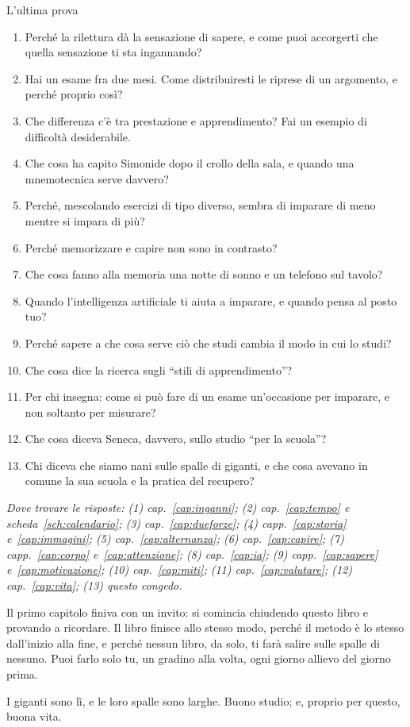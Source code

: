 \begin{riquadro}{L'ultima prova}
\begin{enumerate}
  \item Perché la rilettura dà la sensazione di sapere, e come puoi
        accorgerti che quella sensazione ti sta ingannando?
  \item Hai un esame fra due mesi. Come distribuiresti le riprese di
        un argomento, e perché proprio così?
  \item Che differenza c'è tra prestazione e apprendimento? Fai un
        esempio di difficoltà desiderabile.
  \item Che cosa ha capito Simonide dopo il crollo della sala, e quando
        una mnemotecnica serve davvero?
  \item Perché, mescolando esercizi di tipo diverso, sembra di imparare
        di meno mentre si impara di più?
  \item Perché memorizzare e capire non sono in contrasto?
  \item Che cosa fanno alla memoria una notte di sonno e un telefono
        sul tavolo?
  \item Quando l'intelligenza artificiale ti aiuta a imparare, e quando
        pensa al posto tuo?
  \item Perché sapere a che cosa serve ciò che studi cambia il modo in
        cui lo studi?
  \item Che cosa dice la ricerca sugli \enquote{stili di
        apprendimento}?
  \item Per chi insegna: come si può fare di un esame un'occasione per
        imparare, e non soltanto per misurare?
  \item Che cosa diceva Seneca, davvero, sullo studio \enquote{per la
        scuola}?
  \item Chi diceva che siamo nani sulle spalle di giganti, e che cosa
        avevano in comune la sua scuola e la pratica del recupero?
\end{enumerate}

\smallskip
{\footnotesize\itshape Dove trovare le risposte: (1)
cap.~\ref{cap:inganni}; (2) cap.~\ref{cap:tempo} e
scheda~\ref{sch:calendario}; (3) cap.~\ref{cap:dueforze}; (4)
capp.~\ref{cap:storia} e~\ref{cap:immagini}; (5)
cap.~\ref{cap:alternanza}; (6) cap.~\ref{cap:capire}; (7)
capp.~\ref{cap:corpo} e~\ref{cap:attenzione}; (8) cap.~\ref{cap:ia};
(9) capp.~\ref{cap:sapere} e~\ref{cap:motivazione}; (10)
cap.~\ref{cap:miti}; (11) cap.~\ref{cap:valutare}; (12)
cap.~\ref{cap:vita}; (13) questo congedo.\par}
\end{riquadro}

\asterismo

Il primo capitolo finiva con un invito: si comincia chiudendo questo
libro e provando a ricordare. Il libro finisce allo stesso modo, perché
il metodo è lo stesso dall'inizio alla fine, e perché nessun libro, da
solo, ti farà salire sulle spalle di nessuno. Puoi farlo solo tu, un
gradino alla volta, ogni giorno allievo del giorno prima.

I giganti sono lì, e le loro spalle sono larghe. Buono studio; e,
proprio per questo, buona vita.

\finecapitolo
